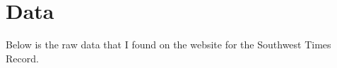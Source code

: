 

\section{Data}
Below is the raw data that I found on the website for the Southwest Times Record.



